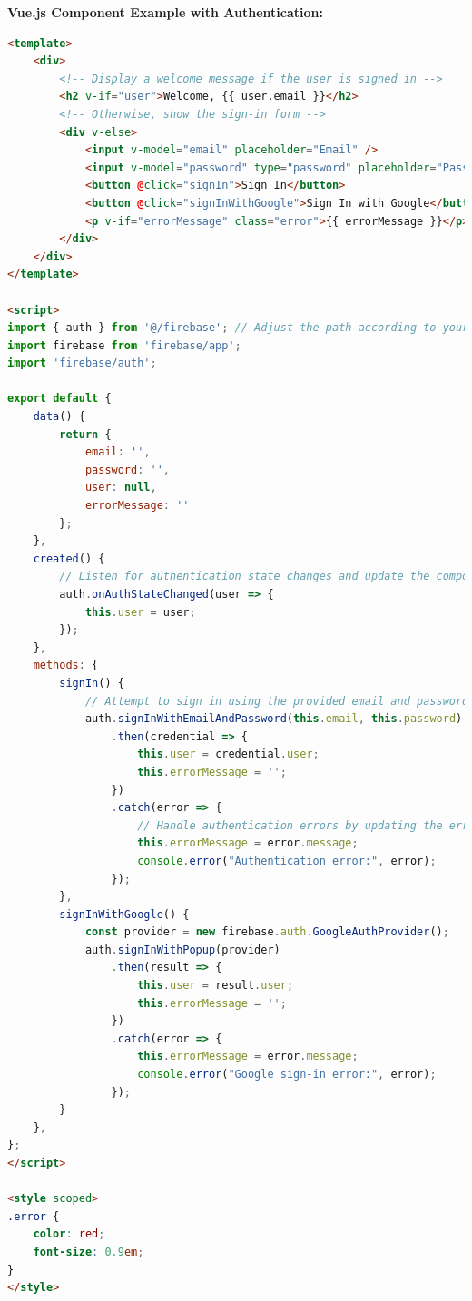 \vspace{1em}
\textbf{Vue.js Component Example with Authentication:}

\begin{lstlisting}[language=HTML, caption={Vue.js component for user sign-in}]
<template>
    <div>
        <!-- Display a welcome message if the user is signed in -->
        <h2 v-if="user">Welcome, {{ user.email }}</h2>
        <!-- Otherwise, show the sign-in form -->
        <div v-else>
            <input v-model="email" placeholder="Email" />
            <input v-model="password" type="password" placeholder="Password" />
            <button @click="signIn">Sign In</button>
            <button @click="signInWithGoogle">Sign In with Google</button>
            <p v-if="errorMessage" class="error">{{ errorMessage }}</p>
        </div>
    </div>
</template>

<script>
import { auth } from '@/firebase'; // Adjust the path according to your project structure
import firebase from 'firebase/app';
import 'firebase/auth';

export default {
    data() {
        return {
            email: '',
            password: '',
            user: null,
            errorMessage: ''
        };
    },
    created() {
        // Listen for authentication state changes and update the component state
        auth.onAuthStateChanged(user => {
            this.user = user;
        });
    },
    methods: {
        signIn() {
            // Attempt to sign in using the provided email and password
            auth.signInWithEmailAndPassword(this.email, this.password)
                .then(credential => {
                    this.user = credential.user;
                    this.errorMessage = '';
                })
                .catch(error => {
                    // Handle authentication errors by updating the errorMessage state
                    this.errorMessage = error.message;
                    console.error("Authentication error:", error);
                });
        },
        signInWithGoogle() {
            const provider = new firebase.auth.GoogleAuthProvider();
            auth.signInWithPopup(provider)
                .then(result => {
                    this.user = result.user;
                    this.errorMessage = '';
                })
                .catch(error => {
                    this.errorMessage = error.message;
                    console.error("Google sign-in error:", error);
                });
        }
    },
};
</script>

<style scoped>
.error {
    color: red;
    font-size: 0.9em;
}
</style>
\end{lstlisting}

